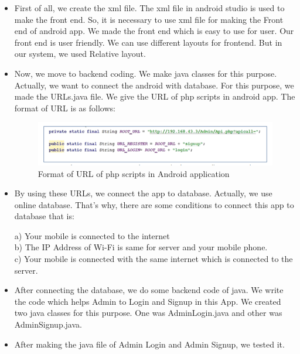 \begin{itemize}

\item First of all, we create the xml file. The xml file in android studio is used to make the front end. So, it is necessary to use xml file for making the Front end of android app. We made the front end which is easy to use for user. Our front end is user friendly. We can use different layouts for frontend. But in our system, we used Relative layout.
\item Now, we move to backend coding. We make java classes for this purpose. Actually, we want to connect the android with database. For this purpose, we made the URLs.java file. We give the URL of php scripts in android app.
\clearpage
 The format of URL is as follows:
 
\begin{figure}[h]
  		\centering
    		\includegraphics[scale=0.9]{./Figures/URL}
\caption{Format of URL of php scripts in Android application}
\label{fig:15}
 		\end{figure}

\item By using these URLs, we connect the app to database. Actually, we use online database. That’s why, there are some conditions to connect this app to database that is:

a)	Your mobile is connected to the internet\\
b)	The IP Address of Wi-Fi is same for server and your mobile phone.\\
c)	Your mobile is connected with the same internet which is connected to the server.
 
\item After connecting the database,   we do some backend code of java. We write the code which helps Admin to Login and Signup in this App. We created two java classes for this purpose. One was AdminLogin.java and other was AdminSignup.java.
\item After making the java file of Admin Login and Admin Signup, we tested it.
\end{itemize}


